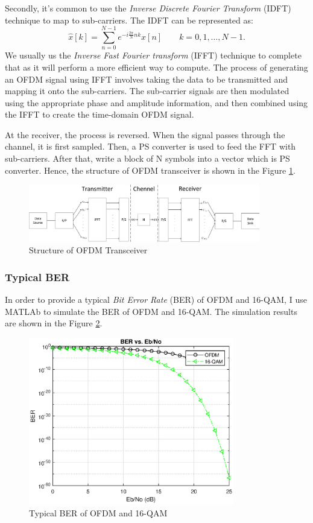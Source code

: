 \documentclass[11pt]{article}
\numberwithin{figure}{section}
\numberwithin{equation}{section}
\begin{document}
Secondly, it's common to use the \textit{Inverse Discrete Fourier Transform} (IDFT) technique to map to sub-carriers. The IDFT can be represented as: 
\begin{equation}
\hat{x}[k]=\sum_{n=0}^{N-1} e^{-i\frac{2\pi}{N}nk}x[n] \qquad k = 0,1,\ldots,N-1. \label{con:idft}
\end{equation}
We usually us the \textit{Inverse Fast Fourier transform} (IFFT) technique to complete that as it will perform a more efficient way to compute. The process of generating an OFDM signal using IFFT involves taking the data to be transmitted and mapping it onto the sub-carriers. The sub-carrier signals are then modulated using the appropriate phase and amplitude information, and then combined using the IFFT to create the time-domain OFDM signal. 

At the receiver, the process is reversed. When the signal passes through the channel, it is first sampled. Then, a PS converter is used to feed the FFT with sub-carriers. After that, write a block of N symbols into a vector which is PS converter. Hence, the structure of OFDM transceiver is shown in the Figure \ref{fig:Transceiver structure}.
\begin{figure}[!ht]
    \centering
    \includegraphics[width=0.9\textwidth]{images/OFDM_transceiver.pdf}
    \caption{Structure of OFDM Transceiver}
    \label{fig:Transceiver structure}
\end{figure}
\subsubsection{Typical BER}
In order to provide a typical \textit{Bit Error Rate} (BER) of OFDM and 16-QAM, I use MATLAb to simulate the BER of OFDM and 16-QAM. The simulation results are shown in the Figure \ref{fig:BER of OFDM and 16-QAM}.
\begin{figure}[!h]
    \centering
    \includegraphics[width=0.8\textwidth]{images/typical_BER.eps}
    \caption{Typical BER of OFDM and 16-QAM}
    \label{fig:BER of OFDM and 16-QAM}
\end{figure}
\end{document}
